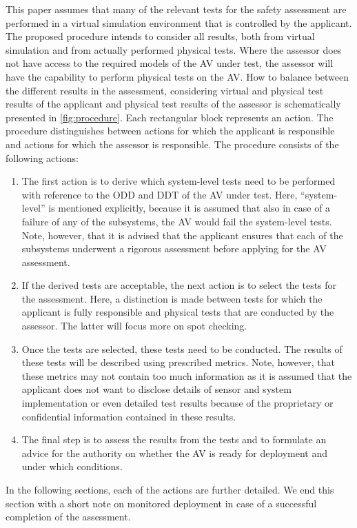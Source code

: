 This paper assumes that many of the relevant tests for the safety assessment are performed in a virtual simulation environment that is controlled by the applicant. The proposed procedure intends to consider all results, both from virtual simulation and from actually performed physical tests. Where the assessor does not have access to the required models of the AV under test, the assessor will have the capability to perform physical tests on the AV. How to balance between the different results in the assessment, considering virtual and physical test results of the applicant and physical test results of the assessor is schematically presented in \cref{fig:procedure}. Each rectangular block represents an action. The procedure distinguishes between actions for which the applicant is responsible and actions for which the assessor is responsible. The procedure consists of the following actions:
\begin{enumerate}
	\item The first action is to derive which system-level tests need to be performed with reference to the ODD and DDT of the AV under test. Here, “system-level” is mentioned explicitly, because it is assumed that also in case of a failure of any of the subsystems, the AV would fail the system-level tests. Note, however, that it is advised that the applicant ensures that each of the subsystems underwent a rigorous assessment before applying for the AV assessment. 
	\item If the derived tests are acceptable, the next action is to select the tests for the assessment. Here, a distinction is made between tests for which the applicant is fully responsible and physical tests that are conducted by the assessor. The latter will focus more on spot checking.
	\item Once the tests are selected, these tests need to be conducted. The results of these tests will be described using prescribed metrics. Note, however, that these metrics may not contain too much information as it is assumed that the applicant does not want to disclose details of sensor and system implementation or even detailed test results because of the proprietary or confidential information contained in these results. 
	\item The final step is to assess the results from the tests and to formulate an advice for the authority on whether the AV is ready for deployment and under which conditions.
\end{enumerate}

In the following sections, each of the actions are further detailed. We end this section with a short note on monitored deployment in case of a successful completion of the assessment.




